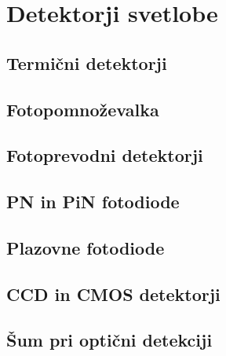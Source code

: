 
\chapter{Detektorji svetlobe}

\section{Termični detektorji}

\section{Fotopomnoževalka}

\section{Fotoprevodni detektorji}

\section{PN in PiN fotodiode}

\section{Plazovne fotodiode}

\section{CCD in CMOS detektorji}

\section{Šum pri optični detekciji}